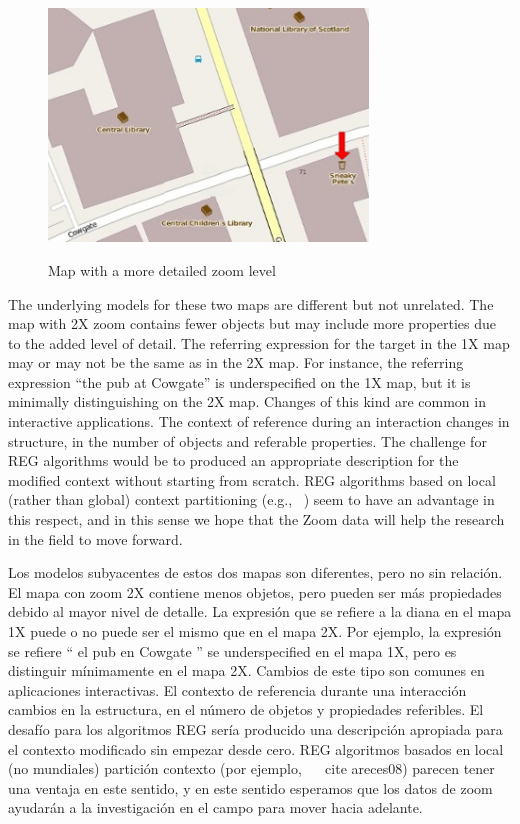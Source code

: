 \begin{figure}[ht]
\begin{center}
\includegraphics[width=8.5cm]{figures/with-zoom.jpg}\\[0pt]
\caption{Map with a more detailed zoom level}
\label{fig-with-zoom}
\end{center}
\end{figure}

The underlying models for these two maps are different but not unrelated. The map with 2X zoom contains fewer objects but may include more properties due to the added level of detail. The  referring expression for the target in the 1X map may or may not be the same as in the 2X map. For instance, the referring expression  ``the pub at Cowgate'' is underspecified on the 1X map, but it is minimally distinguishing on the 2X map. Changes of this kind are common in interactive applications.  The context of reference during an interaction changes in structure, in the number of objects and referable properties. The challenge for REG algorithms would be to produced an appropriate description for the modified context without starting from scratch. REG algorithms based on local (rather than global) context partitioning (e.g., ~\cite{areces08}) seem to have an advantage in this respect, and in this sense we hope that the Zoom data will help the research in the field to move forward.

 Los modelos subyacentes de estos dos mapas son diferentes, pero no sin relaci\'on. El mapa con zoom 2X contiene menos objetos, pero pueden ser m\'as propiedades debido al mayor nivel de detalle. La expresi\'on que se refiere a la diana en el mapa 1X puede o no puede ser el mismo que en el mapa 2X. Por ejemplo, la expresi\'on se refiere `` el pub en Cowgate '' se underspecified en el mapa 1X, pero es distinguir m\'{i}nimamente en el mapa 2X. Cambios de este tipo son comunes en aplicaciones interactivas. El contexto de referencia durante una interacci\'on cambios en la estructura, en el n\'umero de objetos y propiedades referibles. El desaf\'{i}o para los algoritmos REG ser\'{i}a producido una descripci\'on apropiada para el contexto modificado sin empezar desde cero. REG algoritmos basados en local (no mundiales) partici\'on contexto (por ejemplo, ~ \ cite {} areces08) parecen tener una ventaja en este sentido, y en este sentido esperamos que los datos de zoom ayudar\'an a la investigaci\'on en el campo para mover hacia adelante.


